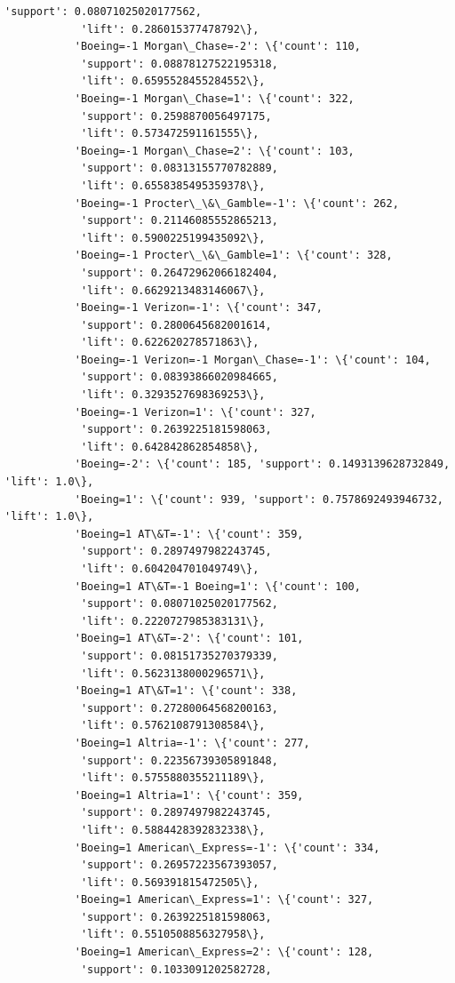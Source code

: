 \documentclass[11pt]{article}
\begin{document}
\begin{Verbatim}[commandchars=\\\{\}]
            'support': 0.08071025020177562,
            'lift': 0.286015377478792\},
           'Boeing=-1 Morgan\_Chase=-2': \{'count': 110,
            'support': 0.08878127522195318,
            'lift': 0.6595528455284552\},
           'Boeing=-1 Morgan\_Chase=1': \{'count': 322,
            'support': 0.2598870056497175,
            'lift': 0.573472591161555\},
           'Boeing=-1 Morgan\_Chase=2': \{'count': 103,
            'support': 0.08313155770782889,
            'lift': 0.6558385495359378\},
           'Boeing=-1 Procter\_\&\_Gamble=-1': \{'count': 262,
            'support': 0.21146085552865213,
            'lift': 0.5900225199435092\},
           'Boeing=-1 Procter\_\&\_Gamble=1': \{'count': 328,
            'support': 0.26472962066182404,
            'lift': 0.6629213483146067\},
           'Boeing=-1 Verizon=-1': \{'count': 347,
            'support': 0.2800645682001614,
            'lift': 0.622620278571863\},
           'Boeing=-1 Verizon=-1 Morgan\_Chase=-1': \{'count': 104,
            'support': 0.08393866020984665,
            'lift': 0.3293527698369253\},
           'Boeing=-1 Verizon=1': \{'count': 327,
            'support': 0.2639225181598063,
            'lift': 0.642842862854858\},
           'Boeing=-2': \{'count': 185, 'support': 0.1493139628732849, 'lift': 1.0\},
           'Boeing=1': \{'count': 939, 'support': 0.7578692493946732, 'lift': 1.0\},
           'Boeing=1 AT\&T=-1': \{'count': 359,
            'support': 0.2897497982243745,
            'lift': 0.604204701049749\},
           'Boeing=1 AT\&T=-1 Boeing=1': \{'count': 100,
            'support': 0.08071025020177562,
            'lift': 0.2220727985383131\},
           'Boeing=1 AT\&T=-2': \{'count': 101,
            'support': 0.08151735270379339,
            'lift': 0.5623138000296571\},
           'Boeing=1 AT\&T=1': \{'count': 338,
            'support': 0.27280064568200163,
            'lift': 0.5762108791308584\},
           'Boeing=1 Altria=-1': \{'count': 277,
            'support': 0.22356739305891848,
            'lift': 0.5755880355211189\},
           'Boeing=1 Altria=1': \{'count': 359,
            'support': 0.2897497982243745,
            'lift': 0.5884428392832338\},
           'Boeing=1 American\_Express=-1': \{'count': 334,
            'support': 0.26957223567393057,
            'lift': 0.569391815472505\},
           'Boeing=1 American\_Express=1': \{'count': 327,
            'support': 0.2639225181598063,
            'lift': 0.5510508856327958\},
           'Boeing=1 American\_Express=2': \{'count': 128,
            'support': 0.1033091202582728,

\end{Verbatim}
\end{document}
